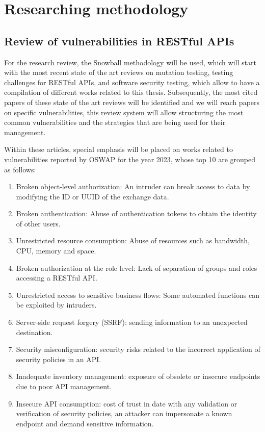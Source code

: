 \section{Researching methodology}

\subsection{ Review of vulnerabilities in RESTful APIs}

For the research review, the Snowball methodology\cite{Chaim2008}  will be used, which will start with the most recent state of the art reviews on mutation testing\cite{Papadakis2019}, testing challenges for RESTful APIs\cite{Ehsan2022}, and software security testing\cite{Golmohammadi2023}, which allow to have a compilation of different works related to this thesis. Subsequently, the most cited papers of these state of the art reviews will be identified and we will reach papers on specific vulnerabilities, this review system will allow structuring the most common vulnerabilities and the strategies that are being used for their management.

Within these articles, special emphasis will be placed on works related to vulnerabilities reported by OSWAP for the year 2023, whose top 10 are grouped as follows:


\begin{enumerate}
    \item Broken object-level authorization: An intruder can break access to data by modifying the ID or UUID of the exchange data.
    \item Broken authentication: Abuse of authentication tokens to obtain the identity of other users.
    \item Unrestricted resource consumption: Abuse of resources such as bandwidth, CPU, memory and space.
    \item Broken authorization at the role level: Lack of separation of groups and roles accessing a RESTful API.
    \item Unrestricted access to sensitive business flows: Some automated functions can be exploited by intruders.
    \item Server-side request forgery (SSRF): sending information to an unexpected destination.
    \item Security misconfiguration: security risks related to the incorrect application of security policies in an API.
    \item Inadequate inventory management: exposure of obsolete or insecure endpoints due to poor API management.
    \item Insecure API consumption: cost of trust in date with any validation or verification of security policies, an attacker can impersonate a known endpoint and demand sensitive information.
\end{enumerate}



